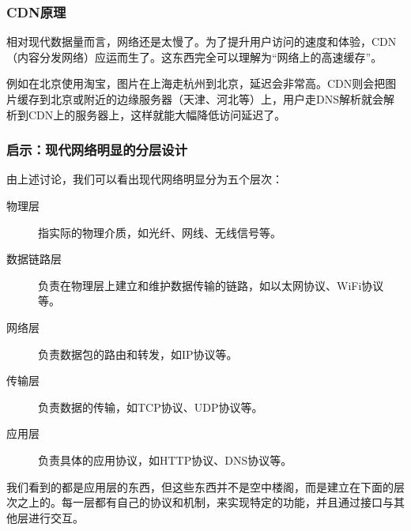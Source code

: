 \documentclass[fontset=none,aspectratio=1610]{ctexbeamer}
\begin{document}
\begin{frame}
    \frametitle{CDN原理}

    相对现代数据量而言，网络还是太慢了。为了提升用户访问的速度和体验，CDN（内容分发网络）应运而生了。这东西完全可以理解为“网络上的高速缓存”。

    例如在北京使用淘宝，图片在上海走杭州到北京，延迟会非常高。CDN则会把图片缓存到北京或附近的边缘服务器（天津、河北等）上，用户走DNS解析就会解析到CDN上的服务器上，这样就能大幅降低访问延迟了。

\end{frame}

\begin{frame}
    \frametitle{启示：现代网络明显的分层设计}

    由上述讨论，我们可以看出现代网络明显分为五个层次：
    \begin{description}
        \item[物理层] 指实际的物理介质，如光纤、网线、无线信号等。
        \item[数据链路层] 负责在物理层上建立和维护数据传输的链路，如以太网协议、WiFi协议等。
        \item[网络层] 负责数据包的路由和转发，如IP协议等。
        \item[传输层] 负责数据的传输，如TCP协议、UDP协议等。
        \item[应用层] 负责具体的应用协议，如HTTP协议、DNS协议等。 
    \end{description}
    我们看到的都是应用层的东西，但这些东西并不是空中楼阁，而是建立在下面的层次之上的。每一层都有自己的协议和机制，来实现特定的功能，并且通过接口与其他层进行交互。

    

\end{frame}






\end{document}
